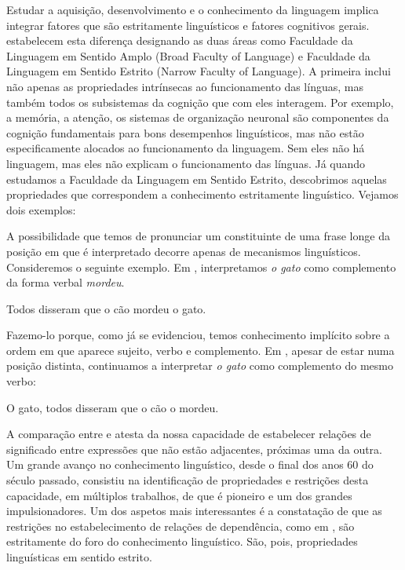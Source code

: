 \documentclass[output=paper,colorlinks,citecolor=brown,booklanguage=portuguese]{langscibook}
\begin{document}
Estudar a aquisição, desenvolvimento e o conhecimento da linguagem implica integrar fatores que são estritamente linguísticos e fatores cognitivos gerais. \citet{Hauser2002} estabelecem esta diferença designando as duas áreas como Faculdade da Linguagem em Sentido Amplo (Broad Faculty of Language) e Faculdade da Linguagem em Sentido Estrito (Narrow Faculty of Language). A primeira inclui não apenas as propriedades intrínsecas ao funcionamento das línguas, mas também todos os subsistemas da cognição que com eles interagem. Por exemplo, a memória, a atenção, os sistemas de organização neuronal são componentes da cognição fundamentais para bons desempenhos linguísticos, mas não estão especificamente alocados ao funcionamento da linguagem. Sem eles não há linguagem, mas eles não explicam o funcionamento das línguas. Já quando estudamos a Faculdade da Linguagem em Sentido Estrito, descobrimos aquelas propriedades que correspondem a conhecimento estritamente linguístico. Vejamos dois exemplos:

A possibilidade que temos de pronunciar um constituinte de uma frase longe da posição em que é interpretado decorre apenas de mecanismos linguísticos. Consideremos o seguinte exemplo. Em , interpretamos \emph{o gato} como complemento da forma verbal \emph{mordeu}.

\ea\label{ex:cap2ex10} Todos disseram que o cão mordeu o gato.
\z

Fazemo-lo porque, como já se evidenciou, temos conhecimento implícito sobre a ordem em que aparece sujeito, verbo e complemento.  Em , apesar de estar numa posição distinta, continuamos a interpretar \emph{o gato} como complemento do mesmo verbo:

\ea\label{ex:cap2ex11} O gato, todos disseram que o cão o mordeu.
\z

A comparação entre  e  atesta da nossa capacidade de estabelecer relações de significado entre expressões que não estão adjacentes, próximas uma da outra. Um grande avanço no conhecimento linguístico, desde o final dos anos 60 do século passado, consistiu na identificação de propriedades e restrições desta capacidade, em múltiplos trabalhos, de que \citet{Ross1967} é pioneiro e um dos grandes impulsionadores. Um dos aspetos mais interessantes é a constatação de que as restrições no estabelecimento de relações de dependência, como em , são estritamente do foro do conhecimento linguístico. São, pois, propriedades linguísticas em sentido estrito. 
\end{document}
